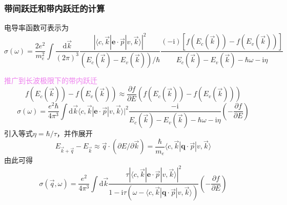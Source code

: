 \documentclass[cjk,slidestop,compress,mathserif,blue]{beamer}
\begin{document}
\frame
{
	\frametitle{带间跃迁和带内跃迁的计算}
电导率函数可表示为
\begin{displaymath}
	\sigma(\omega)=\frac{2e^2}{m_e^2}\int\frac{\mathrm{d}\vec k}{(2\pi)^3}\frac{|\langle c,\vec k|\mathbf{e}\cdot\vec p|v,\vec k\rangle|^2}{(E_c(\vec k)-E_v(\vec k))/\hbar}\frac{(-\mathrm{i})[f(E_c(\vec k))-f(E_v(\vec k))]}{E_c(\vec k)-E_v(\vec k)-\hbar\omega-\mathrm{i}\eta}
  \label{eq:optic-sigma}
\end{displaymath}

\textcolor{violet}{推广到长波极限下的带内跃迁}
\begin{displaymath}
	f(E_c(\vec k))-f(E_v(\vec k))\approx\frac{\partial f}{\partial E}(f(E_c(\vec k))-f(E_v(\vec k)))
\end{displaymath}
\begin{displaymath}
	\sigma(\omega)=\frac{e^2\hbar}{4\pi^3}\int\mathrm{d}\vec k\langle c,\vec k|\mathbf{e}\cdot\vec p|v,\vec k\rangle|^2\frac{-\mathrm{i}}{E_c(\vec k)-E_v(\vec k)-\hbar\omega-\mathrm{i}\eta}\left( -\frac{\partial f}{\partial E} \right)
\end{displaymath}
引入等式$\eta=\hbar/\tau$，并作展开
\begin{displaymath}
	E_{\vec k+\vec q}-E_{\vec k}\approx\vec q\cdot(\partial E/\partial\vec k)=\frac{\hbar}{m_e}\langle c,\vec k|\mathbf{q}\cdot\vec p|v,\vec k\rangle
\end{displaymath}
由此可得
\vspace{-5pt}
\begin{displaymath}
	\sigma(\vec q,\omega)=\frac{e^2}{4\pi^3}\int\mathrm{d}\vec k\frac{\tau|\langle c,\vec k|\mathbf{e}\cdot\vec p|v,\vec k\rangle|^2}{1-\mathrm{i}\tau(\omega-\langle c,\vec k|\mathbf{q}\cdot\vec p|v,\vec k\rangle)}\left( -\frac{\partial f}{\partial E} \right)
\end{displaymath}
}
\end{document}
